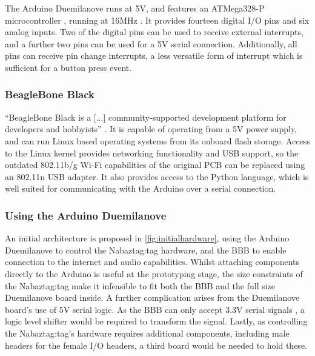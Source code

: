 \documentclass[12pt, a4paper]{article}
\begin{document}
			The Arduino Duemilanove \parencite{duemilanove} runs at 5V, and features an ATMega328-P microcontroller \parencite{atmega328datasheet}, running at 16MHz . It provides fourteen digital \ac{I/O} pins and six analog inputs. Two of the digital pins can be used to receive external interrupts, and a further two pins can be used for a 5V serial connection. Additionally, all pins can receive pin change interrupts, a less versatile form of interrupt which is sufficient for a button press event.
			
		\subsubsection{BeagleBone Black}
			
			``BeagleBone Black is a [...] community-supported development platform for developers and hobbyists'' \parencite{beagleboneblack}. It is capable of operating from a 5V power supply, and can run Linux based operating systems from its onboard flash storage. Access to the Linux kernel provides networking functionality and \ac{USB} support, so the outdated 802.11b/g Wi-Fi capabilities of the original \ac{PCB} can be replaced using an 802.11n \ac{USB} adapter. It also provides access to the Python language, which is well suited for communicating with the Arduino over a serial connection.
			
		\subsubsection{Using the Arduino Duemilanove}
		
		An initial architecture is proposed in \autoref{fig:initialhardware}, using the Arduino Duemilanove to control the Nabaztag:tag  hardware, and the \ac{BBB} to enable connection to the internet and audio capabilities. Whilst attaching components directly to the Arduino is useful at the prototyping stage, the size constraints of the Nabaztag:tag make it infeasible to fit both the \ac{BBB} and the full size Duemilanove board inside. A further complication arises from the Duemilanove board's use of 5V serial logic. As the \ac{BBB} can only accept 3.3V serial signals \parencite{beagleboneblackdatasheet}, a logic level shifter would be required to transform the signal. Lastly, as controlling the Nabaztag:tag's hardware requires additional components, including male headers for the female I/O headers, a third board would be needed to hold these.
			
\end{document}

